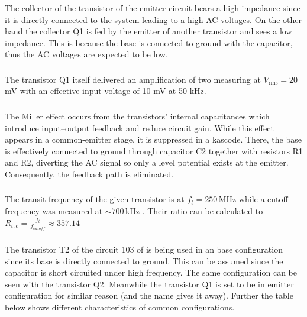\documentclass[a4paper,12pt]{article}
\begin{document}
	\subsubsection{}
	
	The collector of the transistor of the emitter circuit bears a high impedance since it is directly connected to the system leading to a high AC voltages.
	On the other hand the collector Q1 is fed by the emitter of another transistor and sees a low impedance. This is because the base is connected to ground with the capacitor, thus the AC voltages are expected to be low.
	
	\subsubsection{}
	
	The transistor Q1 itself delivered an amplification of two measuring at $V_\mathrm{rms}=20\,$mV with an effective input voltage of 10 mV at 50 kHz.
	
	\subsubsection{}
	
	The Miller effect occurs from the transistors’ internal capacitances which introduce input–output feedback and reduce circuit gain. While this effect appears in a common-emitter stage, it is suppressed in a kascode. There, the base is effectively connected to ground through capacitor C2 together with resistors R1 and R2, diverting the AC signal so only a level potential exists at the emitter. Consequently, the feedback path is eliminated.
	
	\subsubsection{}
	
	The transit frequency of the given transistor is at $f_t = 250\,$MHz while a cutoff frequency was measured at $\sim700\,$kHz \cite{2N2222}. Their ratio can be calculated to $R_{t,c} = \frac{f_t}{f_{cutoff}} \approx 357.14$
	
	\subsubsection{}
	
	The transistor T2 of the circuit 103 of \cite{Elektor_303Circuits_1988} is being used in an base configuration since its base is directly connected to ground. This can be assumed since the capacitor is short circuited under high frequency. The same configuration can be seen with the transistor Q2. Meanwhile the transistor Q1 is set to be in emitter configuration for similar reason (and the name gives it away). Further the table below shows different characteristics of common configurations.
	
\end{document}
